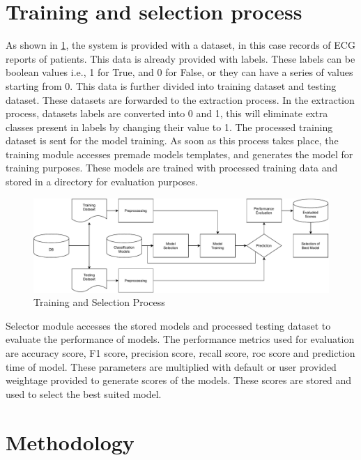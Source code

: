 \section{Training and selection process} \label{sec:data_flow}

As shown in \cref{fig:training_and_selection_process}, the system is provided with a dataset, in this case records of ECG reports of patients. This data is already provided with labels. These labels can be boolean values i.e., 1 for True, and 0 for False, or they can have a series of values starting from 0. This data is further divided into training dataset and testing dataset. These datasets are forwarded to the extraction process. In the extraction process, datasets labels are converted into 0 and 1, this will eliminate extra classes present in labels by changing their value to 1. The processed training dataset is sent for the model training. As soon as this process takes place, the training module accesses premade models templates, and generates the model for training purposes. These models are trained with processed training data and stored in a directory for evaluation purposes.

\begin{figure}[H]
  \centering
  \includegraphics[width=0.9\columnwidth]{media/architecture/Process.pdf}
  \caption{Training and Selection Process}
  \label{fig:training_and_selection_process}
\end{figure}

Selector module accesses the stored models and processed testing dataset to evaluate the performance of models. The performance metrics used for evaluation are accuracy score, F1 score, precision score, recall score, roc score and prediction time of model. These parameters are multiplied with default or user provided weightage provided to generate scores of the models. These scores are stored and used to select the best suited model.

\section{Methodology}\label{sec:methodology}

